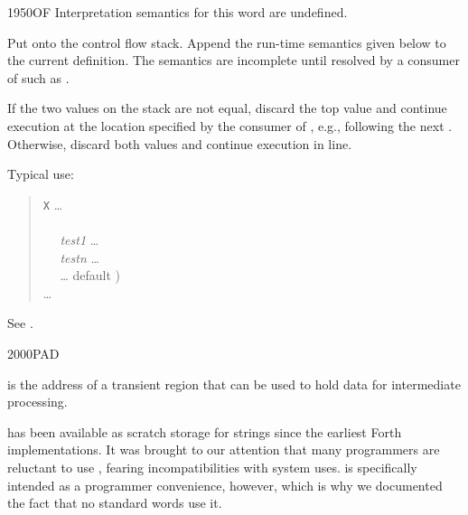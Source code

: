 \begin{worddef}{1950}{OF}
\interpret
	Interpretation semantics for this word are undefined.

\compile

	Put  onto the control flow stack. Append the
	run-time semantics given below to the current definition.
	The semantics are incomplete until resolved by a consumer
	of  such as .

\runtime

	If the two values on the stack are not equal, discard the
	top value and continue execution at the location specified
	by the consumer of , e.g., following the next
	. Otherwise, discard both values and continue
	execution in line.


	\begin{rationale} %
		Typical use:
		\begin{quote}
			\word{:} \texttt{X} {\ldots} \\
			\tab {} \\
			\tab~~ \emph{test1}  {\ldots}  \\
			\tab~~ \emph{testn}  {\ldots}  \\
			\tab~~ {\ldots}  default ) \\
			\tab {} {\ldots} \\
			\word{;}
		\end{quote}
	\end{rationale}

	\begin{testing}
		See .
	\end{testing}
\end{worddef}


\begin{worddef}{2000}{PAD}
\item {}

	 is the address of a transient region that can
	be used to hold data for intermediate processing.


	\begin{rationale} %
		 has been available as scratch storage for strings
		since the earliest Forth implementations. It was brought to
		our attention that many programmers are reluctant to use
		, fearing incompatibilities with system uses.
		 is specifically intended as a programmer convenience,
		however, which is why we documented the fact that no standard
		words use it.
	\end{rationale}
\end{worddef}


